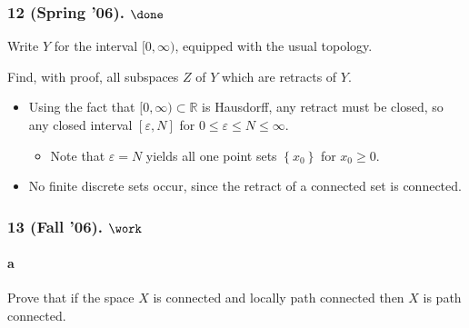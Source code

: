 \hypertarget{spring-06.-done}{%
\subsubsection{\texorpdfstring{12 (Spring '06).
\(\done\)}{12 (Spring '06). \textbackslash done}}\label{spring-06.-done}}

Write \(Y\) for the interval \([0, \infty)\), equipped with the usual
topology.

Find, with proof, all subspaces \(Z\) of \(Y\) which are retracts of
\(Y\).


\begin{solution}

\hfill

\begin{concept}

\hfill

\end{concept}

\begin{itemize}
\tightlist
\item
  Using the fact that \([0, \infty) \subset {\mathbb{R}}\) is Hausdorff,
  any retract must be closed, so any closed interval
  \([\varepsilon, N]\) for \(0\leq \varepsilon\leq N \leq \infty\).

  \begin{itemize}
  \tightlist
  \item
    Note that \(\varepsilon= N\) yields all one point sets
    \(\left\{{x_0}\right\}\) for \(x_0 \geq 0\).
  \end{itemize}
\item
  No finite discrete sets occur, since the retract of a connected set is
  connected.
\end{itemize}

\end{solution}

\hypertarget{fall-06.-work}{%
\subsubsection{\texorpdfstring{13 (Fall '06).
\(\work\)}{13 (Fall '06). \textbackslash work}}\label{fall-06.-work}}

\hypertarget{a}{%
\paragraph{a}\label{a}}

Prove that if the space \(X\) is connected and locally path connected
then \(X\) is path connected.

